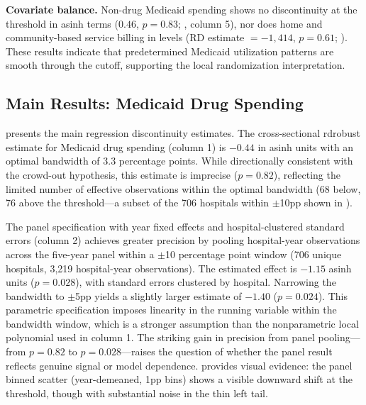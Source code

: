 \documentclass[12pt]{article}
\begin{document}
\textbf{Covariate balance.} Non-drug Medicaid spending shows no discontinuity at the threshold in asinh terms ($0.46$, $p = 0.83$; , column 5), nor does home and community-based service billing in levels (RD estimate $= -1{,}414$, $p = 0.61$; ). These results indicate that predetermined Medicaid utilization patterns are smooth through the cutoff, supporting the local randomization interpretation.


\subsection{Main Results: Medicaid Drug Spending}

 presents the main regression discontinuity estimates. The cross-sectional rdrobust estimate for Medicaid drug spending (column 1) is $-0.44$ in asinh units with an optimal bandwidth of 3.3 percentage points. While directionally consistent with the crowd-out hypothesis, this estimate is imprecise ($p = 0.82$), reflecting the limited number of effective observations within the optimal bandwidth (68 below, 76 above the threshold---a subset of the 706 hospitals within $\pm$10pp shown in ).

The panel specification with year fixed effects and hospital-clustered standard errors (column 2) achieves greater precision by pooling hospital-year observations across the five-year panel within a $\pm$10 percentage point window (706 unique hospitals, 3,219 hospital-year observations). The estimated effect is $-1.15$ asinh units ($p = 0.028$), with standard errors clustered by hospital. Narrowing the bandwidth to $\pm$5pp yields a slightly larger estimate of $-1.40$ ($p = 0.024$). This parametric specification imposes linearity in the running variable within the bandwidth window, which is a stronger assumption than the nonparametric local polynomial used in column 1. The striking gain in precision from panel pooling---from $p = 0.82$ to $p = 0.028$---raises the question of whether the panel result reflects genuine signal or model dependence.  provides visual evidence: the panel binned scatter (year-demeaned, 1pp bins) shows a visible downward shift at the threshold, though with substantial noise in the thin left tail.
\end{document}
